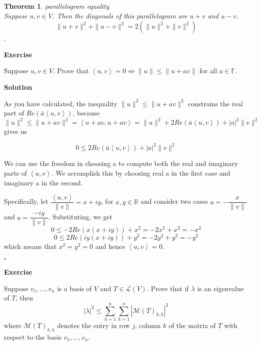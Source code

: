\documentclass{article}
\newtheorem{theorem}{Theorem}[subsection]
\newenvironment{exercise}{%
{\textbf{Exercise\\}
    }
}{
}
\newenvironment{solution}{%
{
    \textbf{Solution\\}
    }
}{
  \hfill $\square$ 
  \par\bigskip 
}
\newcommand{\RR}{\mathbb{R}}
\newcommand{\FF}{\mathbb{F}}
\begin{document}
\begin{CJK}{UTF8}{gkai}
\begin{theorem}
    parallelogram equality\\

    Suppose $u,v \in V$. Then the diagonals of this parallelogram are $u +v$ and $u-v$.
    \[\|u +v\|^2 +\|u-v\|^2 = 2(\|u\|^2 +\|v\|^2)\].
\end{theorem}

\begin{exercise}
    Suppose $u,v \in V$. Prove that $\left<u,v\right> = 0 \Leftrightarrow \|u\| \leq \|u+av\|$ for all $a \in \FF$.  
\end{exercise}

\begin{solution}
    As you have calculated, the inequality $\|u\|^2\leq \|u+av\|^2$ constrains the real part of $Re(\bar{a}\left<u,v\right>)$, because
   \[\|u\|^2\leq \|u+av\|^2=\left<u+av,u+av\right>=\|u\|^2+2Re(\bar{a}\left<u,v\right>)+|a|^2 \|v\|^2\]
   gives us
   
   \[0\leq 2Re(\bar{a}\left<u,v\right>)+|a|^2\|v\|^2\]
   
    We can use the freedom in choosing a to compute both the real and imaginary parts of $\left<u,v\right>$. We accomplish this by choosing real a in the first case and imaginary a in the second.
   
    Specifically, let $\dfrac{\left<u,v\right>}{\|v\|}=x+iy$, for $x,y\in \RR$ and consider two cases $a=-\dfrac{x}{\|v\|}$ and $a = \dfrac{-iy}{\|v\|}$. Substituting, we get  
   \[0\leq -2Re(x(x+iy))+x^2=-2x^2+x^2=-x^2\]
   \[0\leq 2Re(iy(x+iy))+y^2=-2y^2+y^2=-y^2\]
    which means that $x^2=y^2=0$ and hence $\left<u,v\right>=0$.
\end{solution}

\begin{exercise}
    Suppose $v_1,\ldots,v_n$ is a basis of $V$ and $T \in \mathcal{L}(V)$. Prove that if $\lambda$ is an eigenvalue of $T$, then
    \[|\lambda|^2 \leq \sum_{h = 1}^{n}\sum_{k = 1}^{n}|\mathcal{M}(T)_{h,k}|^2\]
    where $\mathcal{M}(T)_{h,k}$ denotes the entry in row $j$, column $k$ of the matrix of $T$ with respect to the basis $v_1,\ldots,v_n$.
\end{exercise}


\end{CJK}
\end{document}
